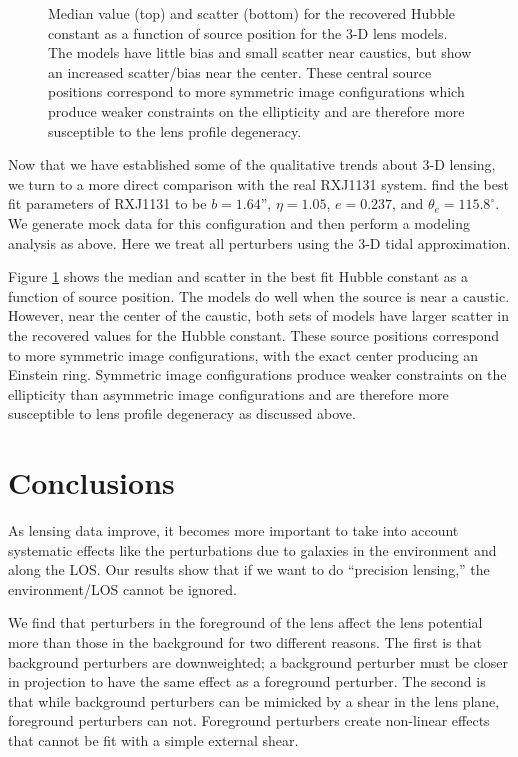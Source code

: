 \documentclass{emulateapj}
\begin{document}
\begin{figure}[t]
\begin{center}
\caption{\label{fig:srcpos}
Median value (top) and scatter (bottom) for the recovered Hubble constant as a function of source position for the 3-D lens models. The models have little bias and small scatter near caustics, but show an increased scatter/bias near the center. These central source positions correspond to more symmetric image configurations which produce weaker constraints on the ellipticity and are therefore more susceptible to the lens profile degeneracy.%
}
\end{center}
\end{figure}

Now that we have established some of the qualitative trends about 3-D lensing, we turn to a more direct comparison with the real RXJ1131 system. \citet{Suyu13} find the best fit parameters of RXJ1131 to be $b = 1.64$'', $\eta = 1.05$, $e = 0.237$, and $\theta_e = 115.8^{\circ}$. We generate mock data for this configuration and then perform a modeling analysis as above. Here we treat all perturbers using the 3-D tidal approximation.

Figure \ref{fig:srcpos} shows the median and scatter in the best fit Hubble constant as a function of source position. The models do well when the source is near a caustic. However, near the center of the caustic, both sets of models have larger scatter in the recovered values for the Hubble constant. These source positions correspond to more symmetric image configurations, with the exact center producing an Einstein ring. Symmetric image configurations produce weaker constraints on the ellipticity than asymmetric image configurations and are therefore more susceptible to lens profile degeneracy as discussed above.


\section{Conclusions}

As lensing data improve, it becomes more important to take into account systematic effects like the perturbations due to galaxies in the environment and along the LOS. Our results show that if we want to do ``precision lensing,'' the environment/LOS cannot be ignored.

We find that perturbers in the foreground of the lens affect the lens potential more than those in the background for two different reasons. The first is that background perturbers are downweighted; a background perturber must be closer in projection to have the same effect as a foreground perturber. The second is that while background perturbers can be mimicked by a shear in the lens plane, foreground perturbers can not. Foreground perturbers create non-linear effects that cannot be fit with a simple external shear.
\end{document}
